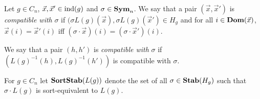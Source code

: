 \documentclass[../paper.tex]{subfiles}
\begin{document}


\begin{definition}
  Let $g \in C_n$, $\vec{x}, \vec{x}' \in \text{\upshape ind}(g)$ and $\sigma \in \text{\textbf{Sym}}_n$. We
  say that a pair $(\vec{x}, \vec{x}')$ is \emph{compatible with} $\sigma$ if
  $(\sigma L(g)(\vec{x}), \sigma L(g)(\vec{x}') \in H_g$ and for all $i \in \text{\textbf{Dom}}
  (\vec{x})$, $\vec{x}(i) = \vec{x}'(i)$ iff $(\sigma \cdot \vec{x})(i) =
  (\sigma \cdot \vec{x}')(i)$.

  We say that a pair $(h, h')$ is \emph{compatible with} $\sigma$ if
  $(L(g)^{-1}(h), L(g)^{-1}(h'))$ is compatible with $\sigma$.
\end{definition}

For $g \in C_n$ let $\text{\textbf{SortStab}} (L(g))$ denote the set of all $\sigma \in
\text{\textbf{Stab}}(H_g)$ such that $\sigma \cdot L(g)$ is sort-equivalent to $L(g)$.
\end{document}
